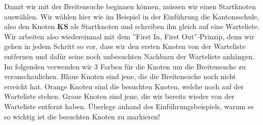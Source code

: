 Damit wir mit der Breitensuche beginnen können, müssen wir einen Startknoten auswählen. Wir wählen hier wie im Beispiel in der Einführung die Kantonsschule, also den Knoten {\bf{KS}} als Startknoten und schreiben ihn gleich auf eine Warteliste. Wir arbeiten also wiedereinmal mit dem ''First In, First Out''-Prinzip, denn wir gehen in jedem Schritt so vor, dass wir den ersten Knoten von der Warteliste entfernen und dafür seine noch unbesuchten Nachbarn der Warteliste anhängen. Im folgenden verwenden wir 3 Farben für die Knoten um die Breitensuche zu veranschaulichen. Blaue Knoten sind jene, die die Breitensuche noch nicht erreicht hat. Orange Knoten sind die besuchten Knoten, welche noch auf der Warteliste stehen. Graue Knoten sind jene, die wir bereits wieder von der Warteliste entfernt haben. Überlege anhand des Einführungsbeispiels, warum es so wichtig ist die besuchten Knoten zu markieren!

